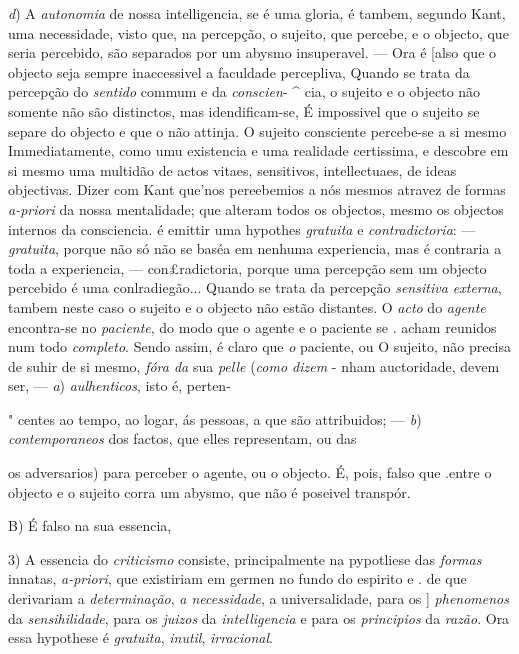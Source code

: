 \emph{d}) A \emph{autonomia} de nossa intelligencia, se é uma gloria, é tambem, segundo Kant, uma necessidade, visto que, na percepção, o sujeito, que percebe, e o objecto, que seria percebido, são separados por um abysmo insuperavel. --- Ora é [also que o objecto seja sempre inaccessivel a faculdade percepliva, Quando se trata da percepção do \emph{sentido} commum e da \emph{conscien}- \textasciicircum{} cia, o sujeito e o objecto não somente não são distinctos, mas idendificam-se, É impossivel que o sujeito se separe do objecto e que o não attinja. O sujeito consciente percebe-se a si mesmo Immediatamente, como umu existencia e uma realidade certissima, e descobre em si mesmo uma multidão de actos vitaes, sensitivos, intellectuaes, de ideas objectivas. Dizer com Kant que'nos pereebemios a nós mesmos atravez de formas \emph{a-priori} da nossa mentalidade; que alteram todos os objectos, mesmo os objectos internos da consciencia. é emittir uma hypothes \emph{gratuita} e \emph{contradictoria}: --- \emph{gratuita}, porque não só não se baséa em nenhuma experiencia, mas é contraria a toda a experiencia, --- con£radictoria, porque uma percepção sem um objecto percebido é uma conlradiegão... Quando se trata da percepção \emph{sensitiva externa}, tambem neste caso o sujeito e o objecto não estão distantes. O \emph{acto} do \emph{agente} encontra-se no \emph{paciente}, do modo que o agente e o paciente se . acham reunidos num todo \emph{completo}. Sendo assim, é claro que \emph{o} paciente, ou O sujeito, não precisa de suhir de si mesmo, \emph{fóra da} sua \emph{pelle} (\emph{como dizem}   - nham auctoridade, devem ser, --- \emph{a}) \emph{aulhenticos}, isto é, perten-

" centes ao tempo, ao logar, ás pessoas, a que são attribuidos; --- \emph{b}) \emph{contemporaneos} dos factos, que elles representam, ou das

os adversarios) para perceber o agente, ou o objecto. É, pois, falso que .entre o objecto e o sujeito corra um abysmo, que não é poseivel transpór.

B) É falso na sua essencia,

3) A essencia do \emph{criticismo} consiste, principalmente na pypotliese das \emph{formas} innatas, \emph{a-priori}, que existiriam em germen no fundo do espirito e . de que derivariam a \emph{determinação}, \emph{a necessidade}, a universalidade, para os ] \emph{phenomenos} da \emph{sensihilidade}, para os \emph{juizos} da \emph{intelligencia} e para os \emph{principios} da \emph{razão}. Ora essa hypothese é \emph{gratuita}, \emph{inutil}, \emph{irracional}.


